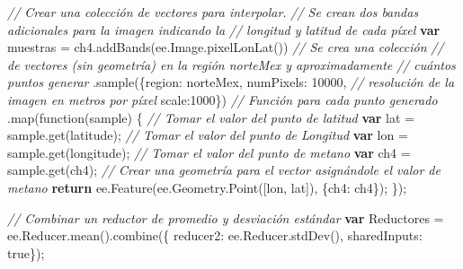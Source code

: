 \documentclass[
  12pt,
  letterpaper,
  twoside]{book}
\newenvironment{Shaded}{\begin{snugshade}}{\end{snugshade}}
\newcommand{\AttributeTok}[1]{\textcolor[rgb]{0.48,0.12,0.64}{#1}}
\newcommand{\CommentTok}[1]{\textcolor[rgb]{0.24,0.58,0.00}{\textit{#1}}}
\newcommand{\ControlFlowTok}[1]{\textcolor[rgb]{0.00,0.00,0.00}{\textbf{#1}}}
\newcommand{\DataTypeTok}[1]{\textcolor[rgb]{0.00,0.00,0.00}{#1}}
\newcommand{\DecValTok}[1]{\textcolor[rgb]{0.28,0.53,0.93}{#1}}
\newcommand{\FunctionTok}[1]{\textcolor[rgb]{0.48,0.12,0.64}{#1}}
\newcommand{\KeywordTok}[1]{\textcolor[rgb]{0.48,0.12,0.64}{#1}}
\newcommand{\NormalTok}[1]{#1}
\newcommand{\OperatorTok}[1]{\textcolor[rgb]{0.00,0.00,0.00}{#1}}
\newcommand{\StringTok}[1]{\textcolor[rgb]{0.87,0.29,0.22}{#1}}
\begin{document}
\begin{Shaded}
\begin{Highlighting}[]
\CommentTok{// Crear una colección de vectores para interpolar.}
\CommentTok{// Se crean dos bandas adicionales para la imagen indicando la }
\CommentTok{// longitud y latitud de cada píxel}
\ControlFlowTok{var}\NormalTok{ muestras }\OperatorTok{=}\NormalTok{ ch4}\OperatorTok{.}\FunctionTok{addBands}\NormalTok{(}\KeywordTok{ee}\OperatorTok{.}\AttributeTok{Image}\OperatorTok{.}\FunctionTok{pixelLonLat}\NormalTok{()) }
  \CommentTok{// Se crea una colección }
  \CommentTok{// de vectores (sin geometría) en la región norteMex y aproximadamente }
  \CommentTok{// cuántos puntos generar}
  \OperatorTok{.}\FunctionTok{sample}\NormalTok{(\{}\DataTypeTok{region}\OperatorTok{:}\NormalTok{ norteMex}\OperatorTok{,} \DataTypeTok{numPixels}\OperatorTok{:} \DecValTok{10000}\OperatorTok{,} 
    \CommentTok{// resolución de la imagen en metros por píxel}
    \DataTypeTok{scale}\OperatorTok{:}\DecValTok{1000}\NormalTok{\}) }
  \CommentTok{// Función para cada punto generado}
  \OperatorTok{.}\FunctionTok{map}\NormalTok{(}\KeywordTok{function}\NormalTok{(sample) \{ }
    \CommentTok{// Tomar el valor del punto de latitud}
    \ControlFlowTok{var}\NormalTok{ lat }\OperatorTok{=}\NormalTok{ sample}\OperatorTok{.}\FunctionTok{get}\NormalTok{(}\StringTok{\textquotesingle{}latitude\textquotesingle{}}\NormalTok{)}\OperatorTok{;} 
    \CommentTok{// Tomar el valor del punto de Longitud}
    \ControlFlowTok{var}\NormalTok{ lon }\OperatorTok{=}\NormalTok{ sample}\OperatorTok{.}\FunctionTok{get}\NormalTok{(}\StringTok{\textquotesingle{}longitude\textquotesingle{}}\NormalTok{)}\OperatorTok{;} 
    \CommentTok{// Tomar el valor del punto de metano}
    \ControlFlowTok{var}\NormalTok{ ch4 }\OperatorTok{=}\NormalTok{ sample}\OperatorTok{.}\FunctionTok{get}\NormalTok{(}\StringTok{\textquotesingle{}ch4\textquotesingle{}}\NormalTok{)}\OperatorTok{;} 
    \CommentTok{// Crear una geometría para el vector asignándole el valor de metano}
    \ControlFlowTok{return} \KeywordTok{ee}\OperatorTok{.}\FunctionTok{Feature}\NormalTok{(}\KeywordTok{ee}\OperatorTok{.}\AttributeTok{Geometry}\OperatorTok{.}\FunctionTok{Point}\NormalTok{([lon}\OperatorTok{,}\NormalTok{ lat])}\OperatorTok{,}\NormalTok{ \{}\DataTypeTok{ch4}\OperatorTok{:}\NormalTok{ ch4\})}\OperatorTok{;}
\NormalTok{  \})}\OperatorTok{;}

\CommentTok{// Combinar un reductor de promedio y desviación estándar}
\ControlFlowTok{var}\NormalTok{ Reductores }\OperatorTok{=} \KeywordTok{ee}\OperatorTok{.}\AttributeTok{Reducer}\OperatorTok{.}\FunctionTok{mean}\NormalTok{()}\OperatorTok{.}\FunctionTok{combine}\NormalTok{(\{}
  \DataTypeTok{reducer2}\OperatorTok{:} \KeywordTok{ee}\OperatorTok{.}\AttributeTok{Reducer}\OperatorTok{.}\FunctionTok{stdDev}\NormalTok{()}\OperatorTok{,}
  \DataTypeTok{sharedInputs}\OperatorTok{:} \KeywordTok{true}\NormalTok{\})}\OperatorTok{;}


\end{Highlighting}
\end{Shaded}
\end{document}
